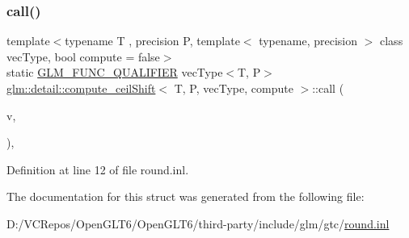 \subsubsection{\texorpdfstring{call()}{call()}}
{\footnotesize\ttfamily template$<$typename T , precision P, template$<$ typename, precision $>$ class vec\+Type, bool compute = false$>$ \\
static \mbox{\hyperlink{setup_8hpp_a33fdea6f91c5f834105f7415e2a64407}{G\+L\+M\+\_\+\+F\+U\+N\+C\+\_\+\+Q\+U\+A\+L\+I\+F\+I\+ER}} vec\+Type$<$T, P$>$ \mbox{\hyperlink{structglm_1_1detail_1_1compute__ceil_shift}{glm\+::detail\+::compute\+\_\+ceil\+Shift}}$<$ T, P, vec\+Type, compute $>$\+::call (\begin{DoxyParamCaption}\item[{vec\+Type$<$ T, P $>$ const \&}]{v,  }\item[{T}]{ }\end{DoxyParamCaption})\hspace{0.3cm}{\ttfamily [inline]}, {\ttfamily [static]}}



Definition at line 12 of file round.\+inl.



The documentation for this struct was generated from the following file\+:\begin{DoxyCompactItemize}
\item 
D\+:/\+V\+C\+Repos/\+Open\+G\+L\+T6/\+Open\+G\+L\+T6/third-\/party/include/glm/gtc/\mbox{\hyperlink{round_8inl}{round.\+inl}}\end{DoxyCompactItemize}
